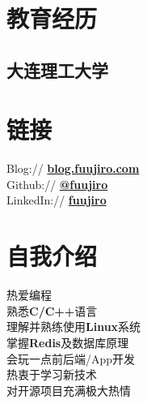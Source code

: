 \documentclass[]{deedy-resume-openfont}
\begin{document}
%
%
\lastupdated

%
%

%
%

\begin{minipage}[t]{0.25\textwidth} 


\section{教育经历} 
\sectionsep

\subsection{大连理工大学}
\sectionsep


\section{链接}
\sectionsep
Blog://  \href{https://blog.fuujiro.com/}{\bf blog.fuujiro.com} \\  
Github:// \href{https://github.com/fuujiro}{\bf @fuujiro} \\
LinkedIn://  \href{https://www.linkedin.com/in/fuujiro}{\bf fuujiro} \\


\section{自我介绍}
热爱编程 \\
熟悉\textbf{C/C++}语言 \\
理解并熟练使用\textbf{Linux}系统 \\
掌握\textbf{Redis}及数据库原理 \\
会玩一点前后端/App开发 \\
热衷于学习新技术 \\
对开源项目充满极大热情 \\
\sectionsep


\end{minipage}
\end{document}
